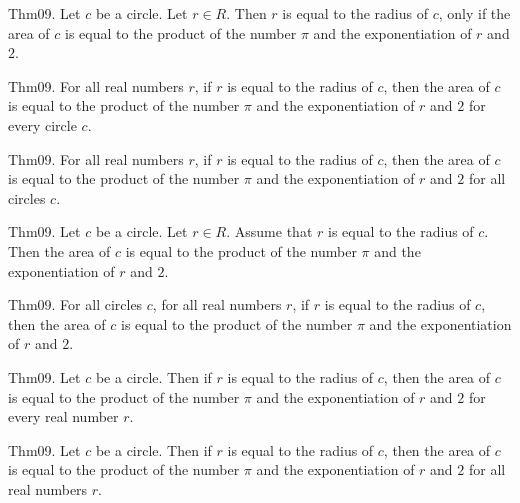 \documentclass{article}
\begin{document}
Thm09. Let $c$ be a circle. Let $r \in R$. Then $r$ is equal to the radius of $c$, only if the area of $c$ is equal to the product of the number \(\pi\) and the exponentiation of $r$ and $2$.

Thm09. For all real numbers $r$, if $r$ is equal to the radius of $c$, then the area of $c$ is equal to the product of the number \(\pi\) and the exponentiation of $r$ and $2$ for every circle $c$.

Thm09. For all real numbers $r$, if $r$ is equal to the radius of $c$, then the area of $c$ is equal to the product of the number \(\pi\) and the exponentiation of $r$ and $2$ for all circles $c$.

Thm09. Let $c$ be a circle. Let $r \in R$. Assume that $r$ is equal to the radius of $c$. Then the area of $c$ is equal to the product of the number \(\pi\) and the exponentiation of $r$ and $2$.

Thm09. For all circles $c$, for all real numbers $r$, if $r$ is equal to the radius of $c$, then the area of $c$ is equal to the product of the number \(\pi\) and the exponentiation of $r$ and $2$.

Thm09. Let $c$ be a circle. Then if $r$ is equal to the radius of $c$, then the area of $c$ is equal to the product of the number \(\pi\) and the exponentiation of $r$ and $2$ for every real number $r$.

Thm09. Let $c$ be a circle. Then if $r$ is equal to the radius of $c$, then the area of $c$ is equal to the product of the number \(\pi\) and the exponentiation of $r$ and $2$ for all real numbers $r$.
\end{document}
